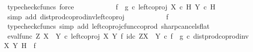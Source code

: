 \begin{isabellebody}
\ {\isacharparenleft}{\kern0pt}typecheck{\isacharunderscore}{\kern0pt}cfuncs{\isacharcomma}{\kern0pt}\ force{\isacharparenright}{\kern0pt}\isanewline
\ \ \ \ \ \ \isamarkupfalse%
\ \isamarkupfalse%
\ {\isachardoublequoteopen}{\isachardot}{\kern0pt}{\isachardot}{\kern0pt}{\isachardot}{\kern0pt}\ {\isacharequal}{\kern0pt}\ {\isacharparenleft}{\kern0pt}f\isactrlsup {\isasymflat}\ {\isasymamalg}\ g\isactrlsup {\isasymflat}\ {\isasymcirc}\isactrlsub c\ left{\isacharunderscore}{\kern0pt}coproj\ {\isacharparenleft}{\kern0pt}X\ {\isasymtimes}\isactrlsub c\ H{\isacharparenright}{\kern0pt}\ {\isacharparenleft}{\kern0pt}Y\ {\isasymtimes}\isactrlsub c\ H{\isacharparenright}{\kern0pt}{\isacharparenright}{\kern0pt}\isactrlsup {\isasymsharp}{\isachardoublequoteclose}\isanewline
\ \ \ \ \ \ \ \ \isamarkupfalse%
\ {\isacharparenleft}{\kern0pt}simp\ add{\isacharcolon}{\kern0pt}\ dist{\isacharunderscore}{\kern0pt}prod{\isacharunderscore}{\kern0pt}coprod{\isacharunderscore}{\kern0pt}inv{}{\isacharunderscore}{\kern0pt}left{\isacharunderscore}{\kern0pt}coproj{\isacharparenright}{\kern0pt}\isanewline
\ \ \ \ \ \ \isamarkupfalse%
\ \isamarkupfalse%
\ {\isachardoublequoteopen}{\isachardot}{\kern0pt}{\isachardot}{\kern0pt}{\isachardot}{\kern0pt}\ {\isacharequal}{\kern0pt}\ f{\isachardoublequoteclose}\isanewline
\ \ \ \ \ \ \ \ \isamarkupfalse%
\ {\isacharparenleft}{\kern0pt}typecheck{\isacharunderscore}{\kern0pt}cfuncs{\isacharcomma}{\kern0pt}\ simp\ add{\isacharcolon}{\kern0pt}\ left{\isacharunderscore}{\kern0pt}coproj{\isacharunderscore}{\kern0pt}cfunc{\isacharunderscore}{\kern0pt}coprod\ sharp{\isacharunderscore}{\kern0pt}cancels{\isacharunderscore}{\kern0pt}flat{\isacharparenright}{\kern0pt}\isanewline
\ \ \ \ \ \ \isamarkupfalse%
\ \isamarkupfalse%
\ {\isachardoublequoteopen}{\isacharparenleft}{\kern0pt}eval{\isacharunderscore}{\kern0pt}func\ Z\ {\isacharparenleft}{\kern0pt}X\ {\isasymCoprod}\ Y{\isacharparenright}{\kern0pt}\ {\isasymcirc}\isactrlsub c\ left{\isacharunderscore}{\kern0pt}coproj\ X\ Y\ {\isasymtimes}\isactrlsub f\ id\isactrlsub c\ {\isacharparenleft}{\kern0pt}Z\isactrlbsup {\isacharparenleft}{\kern0pt}X\ {\isasymCoprod}\ Y{\isacharparenright}{\kern0pt}\isactrlesup {\isacharparenright}{\kern0pt}{\isacharparenright}{\kern0pt}\isactrlsup {\isasymsharp}\ {\isasymcirc}\isactrlsub c\ {\isacharparenleft}{\kern0pt}f\isactrlsup {\isasymflat}\ {\isasymamalg}\ g\isactrlsup {\isasymflat}\ {\isasymcirc}\isactrlsub c\ dist{\isacharunderscore}{\kern0pt}prod{\isacharunderscore}{\kern0pt}coprod{\isacharunderscore}{\kern0pt}inv{}\ X\ Y\ H{\isacharparenright}{\kern0pt}\isactrlsup {\isasymsharp}\ {\isacharequal}{\kern0pt}\ f{\isachardoublequoteclose}\isanewline

\end{isabellebody}
